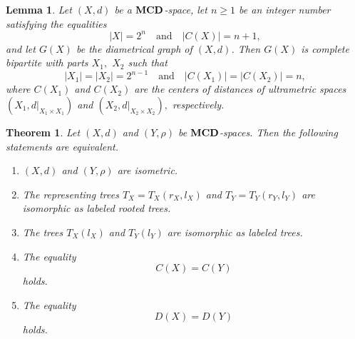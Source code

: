 \documentclass[10pt,a4paper]{amsart}
\newtheorem{thm}{Theorem}
\newtheorem{lem}{Lemma}
\begin{document}
\begin{lem}
    \label{lemlem}
Let $(X,d)$ be a ${\bf MCD}$-space, let $n\geq 1$ be an
integer number satisfying the equalities
\begin{equation}
    \label{ddaad}
|X|=2^n \quad\text{and}\quad |C(X)|=n+1,
\end{equation}
and let $G(X)$ be the diametrical graph of $(X,d)$. Then
$G(X)$ is complete bipartite with parts $X_1,$ $X_2$ such that
\begin{equation}
    \label{ddad2}
|X_1|=|X_2|=2^{n-1}
\quad\text{and}\quad
|C(X_1)|=|C(X_2)|=n,
\end{equation}
where \(C(X_1)\) and \(C(X_2)\) are the centers of distances of ultrametric spaces
\(
(X_1,d|_{X_1\times X_1})\) and \(
(X_2,d|_{X_2\times X_2}),
\)
respectively.
\end{lem}

\begin{thm}\label{m0}
Let $(X,d)$ and $(Y,\rho)$ be $\bf MCD$-spaces.
Then the following statements are equivalent.
\begin{enumerate}
\item $(X,d)$ and $(Y,\rho)$ are isometric.

\item The representing trees
\(
T_X=T_X(r_X,l_X)
\) and
\(T_Y=T_Y(r_Y,l_Y)
\)
are isomorphic as labeled rooted trees.

\item The trees $T_X(l_X)$ and $T_Y(l_Y)$ are isomorphic as labeled trees.

\item The equality
\begin{equation}
    \label{m2}
C(X)=C(Y)
\end{equation}
holds.

\item The equality
\begin{equation*}
D(X)=D(Y)
\end{equation*}
holds.
\end{enumerate}
\end{thm}
\end{document}
